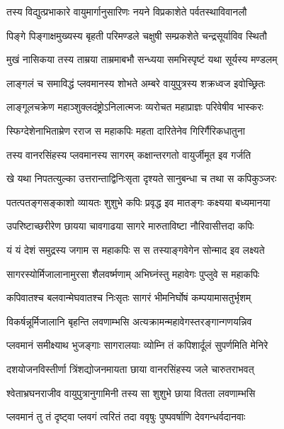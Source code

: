 \twolineshloka
{तस्य विद्युत्प्रभाकारे वायुमार्गानुसारिणः}
{नयने विप्रकाशेते पर्वतस्थाविवानलौ} %

\twolineshloka
{पिङ्गे पिङ्गाक्षमुख्यस्य बृहती परिमण्डले}
{चक्षुषी सम्प्रकशेते चन्द्रसूर्याविव स्थितौ} %

\twolineshloka
{मुखं नासिकया तस्य ताम्रया ताम्रमाबभौ}
{सन्ध्यया समभिस्पृष्टं यथा सूर्यस्य मण्डलम्} %

\twolineshloka
{लाङ्गलं च समाविद्धं प्लवमानस्य शोभते}
{अम्बरे वायुपुत्रस्य शक्रध्वज इवोच्छ्रितः} %

\twolineshloka
{लाङ्गूलचक्रेण महाञ्शुक्लदंष्ट्रोऽनिलात्मजः}
{व्यरोचत महाप्राज्ञः परिवेषीव भास्करः} %

\twolineshloka
{स्फिग्देशेनाभिताम्रेण रराज स महाकपिः}
{महता दारितेनेव गिरिर्गैरिकधातुना} %

\twolineshloka
{तस्य वानरसिंहस्य प्लवमानस्य सागरम्}
{कक्षान्तरगतो वायुर्जीमूत इव गर्जति} %

\twolineshloka
{खे यथा निपतत्युल्का उत्तरान्ताद्विनिःसृता}
{दृश्यते सानुबन्धा च तथा स कपिकुञ्जरः} %

\twolineshloka
{पतत्पतङ्गसङ्काशो व्यायतः शुशुभे कपिः}
{प्रवृद्ध इव मातङ्गः कक्ष्यया बध्यमानया} %

\twolineshloka
{उपरिष्टाच्छरीरेण छायया चावगाढया}
{सागरे मारुताविष्टा नौरिवासीत्तदा कपिः} %

\twolineshloka
{यं यं देशं समुद्रस्य जगाम स महाकपिः}
{स स तस्याङ्गवेगेन सोन्माद इव लक्ष्यते} %

\twolineshloka
{सागरस्योर्मिजालानामुरसा शैलवर्ष्मणाम्}
{अभिघ्नंस्तु महावेगः पुप्लुवे स महाकपिः} %

\twolineshloka
{कपिवातश्च बलवान्मेघवातश्च निःसृतः}
{सागरं भीमनिर्घोषं कम्पयामासतुर्भृशम्} %

\twolineshloka
{विकर्षन्नूर्मिजालानि बृहन्ति लवणाम्भसि}
{अत्यक्रामन्महावेगस्तरङ्गान्गणयन्निव} %

\twolineshloka
{प्लवमानं समीक्ष्याथ भुजङ्गाः सागरालयाः}
{व्योम्नि तं कपिशार्दूलं सुपर्णमिति मेनिरे} %

\twolineshloka
{दशयोजनविस्तीर्णा त्रिंशद्योजनमायता}
{छाया वानरसिंहस्य जले चारुतराभवत्} %

\twolineshloka
{श्वेताभ्रघनराजीव वायुपुत्रानुगामिनी}
{तस्य सा शुशुभे छाया वितता लवणाम्भसि} %

\twolineshloka
{प्लवमानं तु तं दृष्ट्वा प्लवगं त्वरितं तदा}
{ववृषुः पुष्पवर्षाणि देवगन्धर्वदानवाः} %

